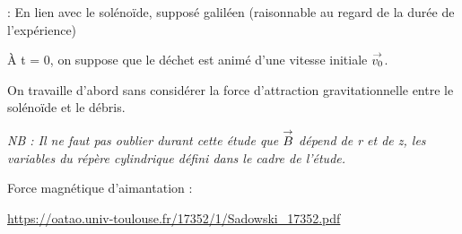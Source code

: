 \documentclass{report}
\begin{document}
: En lien avec le solénoïde, supposé galiléen (raisonnable au regard de la durée de l'expérience)


À t = 0, on suppose que le déchet est animé d'une vitesse initiale $\overset{\to}{v_0}$.


On travaille d'abord sans considérer la force d'attraction gravitationnelle entre le solénoïde et le débris.


\emph{NB : Il ne faut pas oublier durant cette étude que $\overset{\to}{B}$ dépend de r et de z, les variables du répère cylindrique défini dans le cadre de l'étude.}

Force magnétique d'aimantation :

\url{https://oatao.univ-toulouse.fr/17352/1/Sadowski_17352.pdf}
\end{document}
